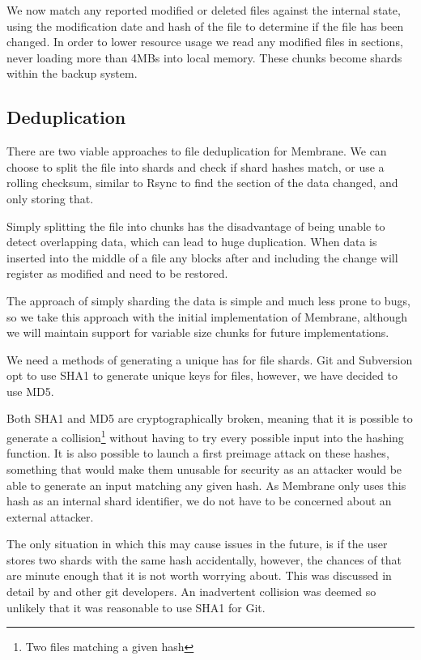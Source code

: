 \documentclass[11pt, a4paper, twocolumn, twoside]{report}
\begin{document}
We now match any reported modified or deleted files against the internal state, using the modification date and hash of the file to determine if the file has been changed. In order to lower resource usage we read any modified files in sections, never loading more than 4MBs into local memory. These chunks become shards within the backup system.

\subsection{Deduplication}

There are two viable approaches to file deduplication for Membrane. We can choose to split the file into shards and check if shard hashes match, or use a rolling checksum, similar to Rsync to find the section of the data changed, and only storing that. \citep{tridgell1996rsync}

Simply splitting the file into chunks has the disadvantage of being unable to detect overlapping data, which can lead to huge duplication. When data is inserted into the middle of a file any blocks after and including the change will register as modified and need to be restored.

The approach of simply sharding the data is simple and much less prone to bugs, so we take this approach with the initial implementation of Membrane, although we will maintain support for variable size chunks for future implementations.

We need a methods of generating a unique has for file shards. Git and Subversion opt to use SHA1 \citep{torvalds2010git} to generate unique keys for files, however, we have decided to use MD5.

Both SHA1 \citep{wang2005collision} and MD5 \citep{stevens2006fast} are cryptographically broken, meaning that it is possible to generate a collision\footnote{Two files matching a given hash} without having to try every possible input into the hashing function. It is also possible to launch a first preimage attack on these hashes, something that would make them unusable for security as an attacker would be able to generate an input matching any given hash. As Membrane only uses this hash as an internal shard identifier, we do not have to be concerned about an external attacker.

The only situation in which this may cause issues in the future, is if the user stores two shards with the same hash accidentally, however, the chances of that are minute enough that it is not worth worrying about. This was discussed in detail by \cite{torvalds2006gitcollisions} and other git developers. An inadvertent collision was deemed so unlikely that it was reasonable to use SHA1 for Git.
\end{document}
